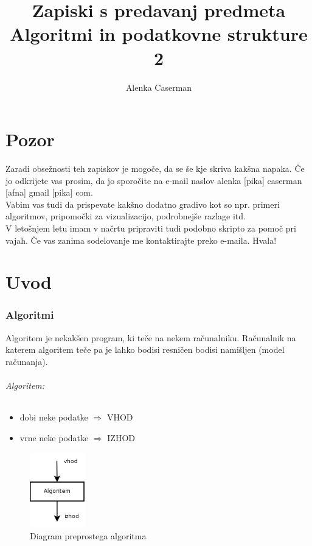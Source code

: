 \documentclass[a4paper,10pt]{article}
\begin{document}
\title{Zapiski s predavanj predmeta Algoritmi in podatkovne strukture 2}
\author{Alenka Caserman}
\maketitle

\tableofcontents

\part{Pozor}
Zaradi obse\v znosti teh zapiskov je mogo\v ce, da se \v se kje skriva kak\v sna napaka. \v Ce jo odkrijete vas prosim, da jo sporo\v cite na e-mail naslov alenka [pika] caserman [afna] gmail [pika] com.\\
Vabim vas tudi da prispevate kak\v sno dodatno gradivo kot so npr. primeri algoritmov, pripomo\v cki za vizualizacijo, podrobnej\v se razlage itd.\\
V leto\v snjem letu imam v na\v crtu pripraviti tudi podobno skripto za pomo\v c pri vajah. \v Ce vas zanima sodelovanje me kontaktirajte preko e-maila.
Hvala!\\

\part{Uvod}

\section{Algoritmi}
Algoritem je nekak\v sen program, ki te\v ce na nekem ra\v cunalniku. Ra\v cunalnik na katerem algoritem te\v ce pa je lahko bodisi resni\v cen bodisi nami\v sljen (model ra\v cunanja).

\paragraph{Algoritem:}
\begin{itemize}
\item dobi neke podatke $\Rightarrow$ VHOD
\item vrne neke podatke $\Rightarrow$ IZHOD
\end{itemize}

\begin{figure}[h]
	\centering
	\includegraphics[width=2.45cm,height=3.25cm]{Slike/Algoritem}
	\caption{Diagram preprostega algoritma}
\end{figure}
\end{document}
